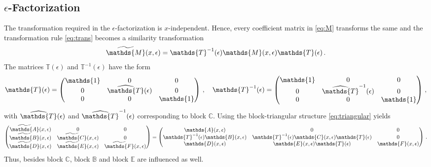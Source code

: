\documentclass[12pt]{article}
\numberwithin{equation}{section}
\numberwithin{figure}{section}
\newcommand{\M}{\mathds{M}}
\newcommand{\A}{\mathds{A}}
\newcommand{\B}{\mathds{B}}
\newcommand{\C}{\mathds{C}}
\newcommand{\D}{\mathds{D}}
\newcommand{\E}{\mathds{E}}
\newcommand{\F}{\mathds{F}}
\newcommand{\T}{\mathds{T}}
\begin{document}
    \subsection{$\epsilon$-Factorization}
      The transformation required in the $\epsilon$-factorization is $x$-independent.
      Hence, every coefficient matrix in \eqref{eq:M} transforms the same and the transformation rule \eqref{eq:trans} becomes a similarity transformation
      \[
        \widetilde\M(x,\epsilon)
        =
        \T^{-1}(\epsilon)
        \M(x,\epsilon)
        \T(\epsilon)\,.
      \]
      The matrices $\T(\epsilon)$ and $\T^{-1}(\epsilon)$ have the form
      \[
        \T(\epsilon) = \begin{pmatrix}
          \mathds{1} & 0 & 0 \\
          0 & \widehat\T(\epsilon) & 0 \\
          0 & 0 & \mathds{1}
        \end{pmatrix}\,, \quad
        \T^{-1}(\epsilon) = \begin{pmatrix}
          \mathds{1} & 0 & 0 \\
          0 & \widehat\T^{-1}(\epsilon) & 0 \\
          0 & 0 & \mathds{1}
        \end{pmatrix}\,,
      \]
      with $\widehat\T(\epsilon)$ and $\widehat\T^{-1}(\epsilon)$ corresponding to block $\C$.
      Using the block-triangular structure \eqref{eq:triangular} yields
      \[
        \begin{pmatrix}
          \widetilde\A(x,\epsilon) & 0 & 0 \\
          \widetilde\B(x,\epsilon) & \widetilde\C(x,\epsilon) & 0 \\
          \widetilde\D(x,\epsilon) & \widetilde\E(x,\epsilon) & \widetilde\F(x,\epsilon)
        \end{pmatrix}
        =
        \begin{pmatrix}
          \A(x,\epsilon) & 0 & 0 \\
          \T^{-1}(\epsilon) \B(x,\epsilon) & \T^{-1}(\epsilon) \C(x,\epsilon) \T(\epsilon) & 0 \\
          \D(x,\epsilon) & \E(x,\epsilon) \T(\epsilon) & \F(x,\epsilon)
        \end{pmatrix}\,.
      \]
      Thus, besides block $\C$, block $\B$ and block $\E$ are influenced as well.

  
\end{document}
